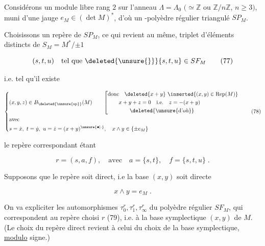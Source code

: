 

Considérons un module libre    rang $2$ sur l'anneau $\Lambda=\Lambda_0$ $(\simeq\mathbb{Z}$ ou $\mathbb{Z}/n\mathbb{Z}$, $n\geq3)$,  muni d'une jauge $e_M\in(\det M)^*$, d'où un -polyèdre régulier triangulé $SP_M$.

Choisissons un repère  de $SP_M$,    ce qui revient au même,  triplet d'éléments distincts de $S_M=M^*/{\pm1}$

\[
(s,t,u)\quad\text{tel que }\deleted{\unsure{\}}}\{s,t,u\}\in SF_M\tag*{(77)}
\]

i.e. tel qu'il existe

\[
\left\{\begin{aligned}
&(x,y,z)\in B_{\deleted{\unsure{\mathrm{sp}}}}(M)\qquad
\left[\begin{aligned}
&\text{donc}\quad\deleted{x+y}\ \inserted{(x,y)\in\operatorname{Rep}(M)}\\
&\qquad x+y+z=0\quad\text{i.e.}\quad z=-(x+y)\\
&\qquad\qquad\deleted{\text{\unsure{d'où}}}
\end{aligned}\right.\\
&\text{avec}\\
&s=\dot{x},\ t=\dot{y},\ u=\dot{z}=(x+y)^{\unsure{\bullet|\cdot}},\quad x\wedge y\in\{\pm e_M\}
\end{aligned}\right.\tag*{(78)}
\]

le repère correspondant étant

\[
r=(s,a,f),\quad\text{avec}\quad a=\{s,t\},\quad f=\{s,t,u\}\;.\tag*{(79)}
\]

 Supposons que le repère soit direct, i.e la base $(x,y)$ soit directe

\[
x\wedge y=e_M\;.\tag*{(80)}
\]

On va expliciter les automorphismes $\tau_0^r,\tau_1^r,\tau_\infty^r$ du polyèdre régulier $SF_M$, qui correspondent au repère  choisi $r$ (79), i.e. à la base symplectique $(x,y)$ de $M$. (Le choix  du repère direct revient à celui du choix de la base symplectique, \uline{modulo} signe.)

